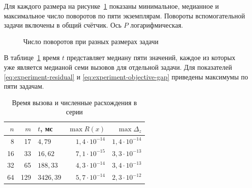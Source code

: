 Для каждого размера на рисунке~\ref{fig:experiment-pivots} показаны
минимальное, медианное и максимальное число поворотов по пяти экземплярам.
Повороты вспомогательной задачи включены в общий счётчик.
Ось $P$ логарифмическая.

\begin{figure}[htbp]
  \centering
  \caption{Число поворотов при разных размерах задачи}
  \label{fig:experiment-pivots}
\end{figure}

В таблице~\ref{tab:experiment-sizes} время $t$ представляет медиану пяти
значений, каждое из которых уже является медианой семи вызовов для
отдельной задачи. Для показателей \eqref{eq:experiment-residual}
и \eqref{eq:experiment-objective-gap} приведены максимумы по пяти задачам.

\begin{table}[htbp]
  \caption{Время вызова и численные расхождения в серии}
  \label{tab:experiment-sizes}
  \begin{tabularx}{\textwidth}{@{}r r >{\raggedleft\arraybackslash}X r r@{}}
    \toprule
    $n$ & $m$ & $t$, мс & $\max R(x)$ & $\max \Delta_z$ \\
    \midrule
    8  & 17  & $4{,}79$    & $1{,}4\cdot10^{-14}$ & $1{,}4\cdot10^{-14}$ \\
    16 & 33  & $16{,}62$   & $7{,}1\cdot10^{-15}$ & $3{,}3\cdot10^{-13}$ \\
    32 & 65  & $188{,}33$  & $4{,}3\cdot10^{-14}$ & $3{,}4\cdot10^{-13}$ \\
    64 & 129 & $3426{,}39$ & $5{,}7\cdot10^{-14}$ & $2{,}3\cdot10^{-12}$ \\
    \bottomrule
  \end{tabularx}
\end{table}

